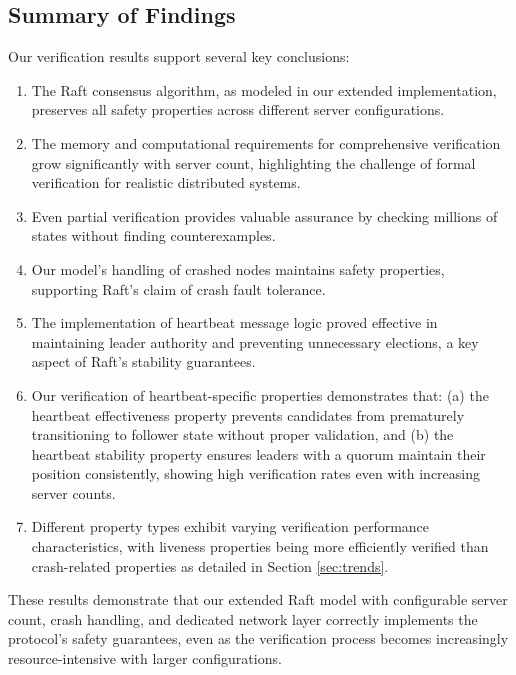 \documentclass[a4paper]{llncs}
\begin{document}
\subsection{Summary of Findings}
\label{sec:findings}
Our verification results support several key conclusions:
\begin{enumerate}
    \item The Raft consensus algorithm, as modeled in our extended implementation, preserves all safety properties across different server configurations.
    
    \item The memory and computational requirements for comprehensive verification grow significantly with server count, highlighting the challenge of formal verification for realistic distributed systems.
    
    \item Even partial verification provides valuable assurance by checking millions of states without finding counterexamples.
    
    \item Our model's handling of crashed nodes maintains safety properties, supporting Raft's claim of crash fault tolerance.
    
    \item The implementation of heartbeat message logic proved effective in maintaining leader authority and preventing unnecessary elections, a key aspect of Raft's stability guarantees.
    
    \item Our verification of heartbeat-specific properties demonstrates that: (a) the heartbeat effectiveness property prevents candidates from prematurely transitioning to follower state without proper validation, and (b) the heartbeat stability property ensures leaders with a quorum maintain their position consistently, showing high verification rates even with increasing server counts.

    \item Different property types exhibit varying verification performance characteristics, with liveness properties being more efficiently verified than crash-related properties as detailed in Section \ref{sec:trends}.
\end{enumerate}

These results demonstrate that our extended Raft model with configurable server count, crash handling, and dedicated network layer correctly implements the protocol's safety guarantees, even as the verification process becomes increasingly resource-intensive with larger configurations.
\end{document}
